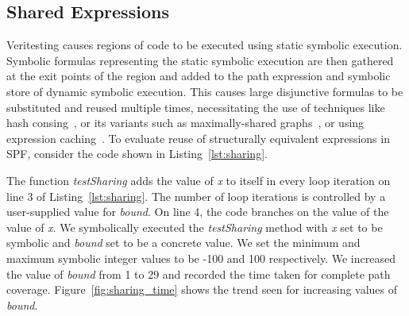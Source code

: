\subsection{Shared Expressions}
Veritesting causes regions of code to be executed using static symbolic execution.
%
Symbolic formulas representing the static symbolic execution are then gathered at the exit points of the region and added to the path expression and symbolic store of dynamic symbolic execution.
%
This causes large disjunctive formulas to be substituted and reused multiple times, necessitating the use of techniques like hash consing~\cite{hashconsing}, or its variants such as maximally-shared graphs~\cite{babic}, or using expression caching~\cite{green}.
%
To evaluate reuse of structurally equivalent expressions in SPF, consider the code shown in Listing~\ref{lst:sharing}.
%

%
The function \textit{testSharing} adds the value of \textit{x} to itself in every loop iteration on line 3 of Listing~\ref{lst:sharing}.
%
The number of loop iterations is controlled by a user-supplied value for \textit{bound}.
%
On line 4, the code branches on the value of the value of \textit{x}.
%
We symbolically executed the \textit{testSharing} method with \textit{x} set to be symbolic and \textit{bound} set to be a concrete value.
%
We set the minimum and maximum symbolic integer values to be -100 and 100 respectively.
%
We increased the value of \textit{bound} from 1 to 29 and recorded the time taken for complete path coverage.
%
Figure~\ref{fig:sharing_time} shows the trend seen for increasing values of \textit{bound}.
%
